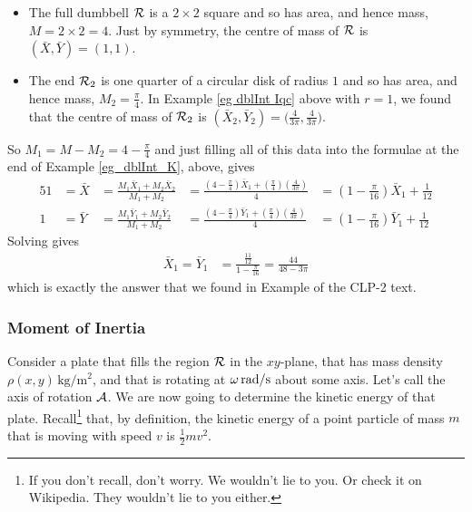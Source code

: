 \begin{eg}
{\begin{efig}
\end{efig}
}
\begin{itemize}\itemindent-0.1in \itemsep1pt \parskip0pt 
\item 
The full dumbbell $\mathcal{R}$ is a $2\times 2$ square and so has area, and hence 
mass, $M=2\times 2=4$.
Just by symmetry, the centre of mass of $\mathcal{R}$ is $(\bar X,\bar Y)=(1,1)$. 
\item
The end $\mathcal{R}_2$ is one quarter of a circular disk of radius $1$ and so has
area, and hence mass, $M_2=\tfrac{\pi}{4}$. In Example \ref{eg dblInt Iqc} 
above with $r=1$, we found that the centre of mass of $\mathcal{R}_2$ is 
$(\bar X_2,\bar Y_2)=\big(\tfrac{4}{3\pi},\tfrac{4}{3\pi})$.
\end{itemize}
So $M_1=M-M_2=4-\tfrac{\pi}{4}$ and
just filling all of this data into the formulae at the end of 
Example \ref{eg_dblInt_K}, above, gives
\begin{alignat*}{5}
1&= \bar X &= \frac{M_1 \bar X_1 + M_2 \bar X_2}{M_1+M_2}
  &= \frac{ (4-\frac{\pi}{4})\bar X_1 + (\frac{\pi}{4})(\tfrac{4}{3\pi})}{4}
  &= \left(1-\frac{\pi}{16}\right)\bar X_1 + \frac{1}{12}
\\
1&= \bar Y &= \frac{M_1 \bar Y_1 + M_2 \bar Y_2}{M_1+M_2}
  &= \frac{ (4-\frac{\pi}{4})\bar Y_1 + (\frac{\pi}{4})(\tfrac{4}{3\pi})}{4}
  &= \left(1-\frac{\pi}{16}\right)\bar Y_1 + \frac{1}{12}
\end{alignat*}
Solving gives
\begin{align*}
\bar X_1=\bar Y_1&=\frac{\frac{11}{12}}{1-\frac{\pi}{16}}=\frac{44}{48-3\pi}
\end{align*}
which is exactly the answer that we found in Example  of the CLP-2 text.

\end{eg}

\subsubsection{Moment of Inertia}
Consider a plate that fills the region $\mathcal{R}$ in the $xy$-plane,
that has mass density $\rho(x,y)\,\text{kg}/\text{m}^2$, and that is
rotating at $\omega\,\text{rad}/\text{s}$  about some axis.
Let's call the axis of rotation $\mathcal{A}$.
We are now going to determine the kinetic energy of that plate. 
Recall\footnote{If you don't recall, don't worry. We wouldn't lie to you.
Or check it on Wikipedia. They wouldn't lie to you either.
} 
that, by definition, the kinetic energy of a point particle of
mass $m$ that is moving with speed $v$ is $\frac{1}{2}mv^2$.

